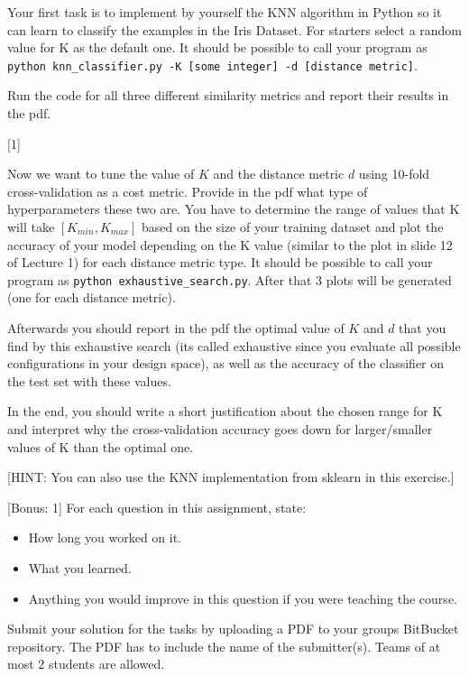 \documentclass{exam}
\begin{document}
\begin{questions}
\begin{itemize}
		\end{itemize}	
		
		Your first task is to implement by yourself the KNN algorithm in Python so it can learn to classify the examples in the Iris Dataset. For starters select a random value for K as the default one. It should be possible to call your program as \texttt{python knn\_classifier.py -K [some integer] -d [distance metric]}.
			
		Run the code for all three different similarity metrics and report their results in the pdf.
		
		[1]
		
		Now we want to tune the value of $K$ and the distance metric $d$ using 10-fold cross-validation as a cost metric. 
		Provide in the pdf what type of hyperparameters these two are.
		You have to determine the range of values that K will take $[K_{min}, K_{max}]$ based on the size of your training dataset and plot the accuracy of your model depending on the K value (similar to the plot in slide 12 of Lecture 1) for each distance metric type. 
		It should be possible to call your program as \texttt{python exhaustive\_search.py}. After that 3 plots will be generated (one for each distance metric).
		
		Afterwards you should report in the pdf the optimal value of $K$ and $d$ that you find by this exhaustive search (its called exhaustive since you evaluate all possible configurations in your design space), as well as the accuracy of the classifier on the test set with these values. 
		
		In the end, you should write a short justification about the chosen range for K and interpret why the cross-validation accuracy goes down for larger/smaller values of K than the optimal one.

		[HINT: You can also use the KNN implementation from sklearn in this exercise.]
		
		[Bonus: 1]
		For each question in this assignment, state:
		\begin{itemize}
			\item How long you worked on it.
			\item What you learned.
			\item Anything you would improve in this question if you were teaching the course.
		\end{itemize}
	\end{questions}
	
	\noindent
	Submit your solution for the tasks by uploading a PDF to your groups BitBucket repository. The PDF has to include the name of the submitter(s). Teams of at most $2$ students are allowed.
\end{document}

